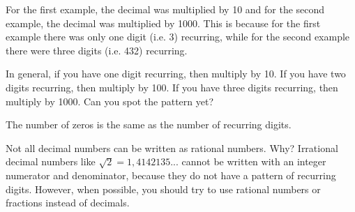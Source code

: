       \label{m38348*id64459}For the first example, the decimal was multiplied by 10 and for the second example, the decimal was multiplied by 1000. This is because for the first example there was only one digit (i.e. 3) recurring, while for the second example there were three digits (i.e. 432) recurring.\par 
      \label{m38348*id64465}In general, if you have one digit recurring, then multiply by 10. If you have two digits recurring, then multiply by 100. If you have three digits recurring, then multiply by 1000. Can you spot the pattern yet?\par 
      \label{m38348*id64470}The number of zeros is the same as the number of recurring digits.\par 
      \label{m38348*id64474}Not all decimal numbers can be written as rational numbers. Why? Irrational decimal numbers like 
$\sqrt{2}=1,4142135...$
cannot be written with an integer numerator and denominator, because they do not have a pattern of recurring digits. However, when possible, you should try to use rational numbers or fractions instead of decimals.\par 
\label{m38348*secfhsst!!!underscore!!!id606}
